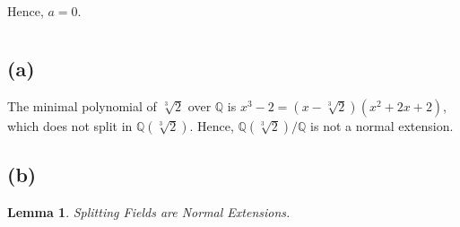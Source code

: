 \documentclass{article}
\newtheorem{lemma}[theorem]{Lemma}
\begin{document}
Hence, $a=0$.
\section{}
\subsection*{(a)}
The minimal polynomial of $\sqrt[3]{2}$ over $\mathbb{Q}$ is $x^3-2=(x-\sqrt[3]{2})(x^2+2x+2)$, which does not split in $\mathbb{Q}(\sqrt[3]{2})$. Hence, $\mathbb{Q}(\sqrt[3]{2})/\mathbb{Q}$ is not a normal extension.
\subsection*{(b)}
\begin{lemma}
Splitting Fields are Normal Extensions.
\end{lemma}
\end{document}
